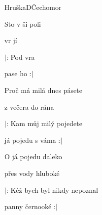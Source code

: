 \begin{song}{Hruška}{D}{Čechomor}

\begin{SBVerse}

Sto v ši poli

vr jí 

$|$: Pod    vra

pase ho  :$|$

\end{SBVerse}

\begin{SBVerse}

Proč má milá dnes pásete

z večera do rána

$|$: Kam můj milý pojedete

já pojedu s váma :$|$

\end{SBVerse}

\begin{SBVerse}

O já pojedu daleko

přes vody hluboké

$|$: Kéž bych byl nikdy nepoznal

panny černooké :$|$

\end{SBVerse}

\end{song}

\clearpage
